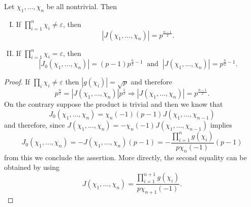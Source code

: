 \begin{theorem}
   Let \(\chi_1, \dots, \chi_n\) be all nontrivial. Then
   \begin{enumerate}[I.]
      \item If \(\prod_{i=1}^n \chi_i \neq  \varepsilon\), then
         \[
            |J(\chi_1, \dots, \chi_n)| = p^{\frac{n-1}{2}}.
         \] 
      \item If \(\prod_{i=1}^n \chi_i = \varepsilon\), then
         \[
            |J_0(\chi_1, \dots, \chi_n)| = (p-1)p^{\frac{n}{2} - 1}\ \text{ and
            }\ |J(\chi_1,\dots, \chi_n)| = p^{\frac{n}{2} - 1}.
         \] 
   \end{enumerate}
\end{theorem}

\begin{proof}
   If \(\prod_i \chi_i \neq  \varepsilon\) then \(|g(\chi_i)| = \sqrt{p}  \) and
   therefore 
   \[
      p^{\frac{n}{2}} = |J(\chi_1, \dots, \chi_n)| p^{\frac{1}{2}} 
      \Rightarrow  |J(\chi_1, \dots, \chi_n)| = p^{\frac{n-1}{2}}.
   \] 
   On the contrary suppose the product is trivial and then we know that
   \[
      J_0(\chi_1,\dots,\chi_n) = \chi_n(-1) (p-1) J(\chi_1, \dots, \chi_{n-1})
   \] 
   and therefore, since \(J(\chi_1, \dots, \chi_n) = -\chi_n(-1)
   J(\chi_1,\dots,\chi_{n-1})\) implies
    \[
       J_0(\chi_1,\dots, \chi_n) = - J(\chi_1, \dots, \chi_n) (p-1) = -
       \frac{\prod_{i=1}^{n}g(\chi_i)}{p \chi_n(-1)} (p-1)
   \] 
   from this we conclude the assertion. More directly, the second equality can
   be obtained by using
   \[
      J(\chi_1,\dots,\chi_n) = \frac{\prod_{i=1}^{n+1}
      g(\chi_i)}{p\chi_{n+1}(-1)}.
   \] 
\end{proof}


